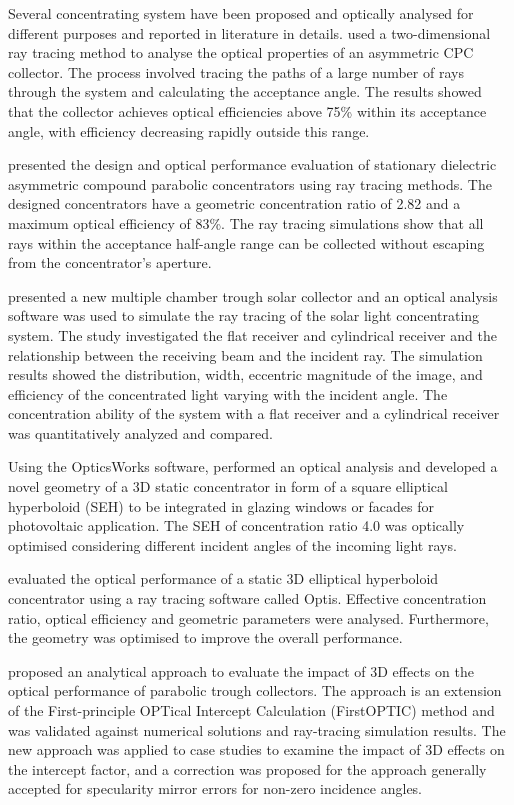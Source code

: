 Several concentrating system have been proposed and optically analysed for different purposes and reported in literature in details. \citet{Souliotis2011} used a two-dimensional ray tracing method to analyse the optical properties of an asymmetric CPC collector. The process involved tracing the paths of a large number of rays through the system and calculating the acceptance angle. The results showed that the collector achieves optical efficiencies above 75\% within its acceptance angle, with efficiency decreasing rapidly outside this range.

\citet{Sarmah2011} presented the design and optical performance evaluation of stationary dielectric asymmetric compound parabolic concentrators using ray tracing methods. The designed concentrators have a geometric concentration ratio of 2.82 and a maximum optical efficiency of 83\%. The ray tracing simulations show that all rays within the acceptance half-angle range can be collected without escaping from the concentrator's aperture.

\citet{Zheng2011} presented a new multiple chamber trough solar collector and an optical analysis software was used to simulate the ray tracing of the solar light concentrating system. The study investigated the flat receiver and cylindrical receiver and the relationship between the receiving beam and the incident ray. The simulation results showed the distribution, width, eccentric magnitude of the image, and efficiency of the concentrated light varying with the incident angle. The concentration ability of the system with a flat receiver and a cylindrical receiver was quantitatively analyzed and compared.

Using the OpticsWorks software, \citet{Sellami2012} performed an optical analysis and developed a novel geometry of a 3D static concentrator in form of a square elliptical hyperboloid (SEH) to be integrated in glazing windows or facades for photovoltaic application. The SEH of concentration ratio 4.0 was optically optimised considering different incident angles of the incoming light rays.

\citet{Ali2013} evaluated the optical performance of a static 3D elliptical hyperboloid concentrator using a ray tracing software called Optis. Effective concentration ratio, optical efficiency and geometric parameters were analysed. Furthermore, the geometry was optimised to improve the overall performance.

\citet{Binotti2013} proposed an analytical approach to evaluate the impact of 3D effects on the optical performance of parabolic trough collectors. The approach is an extension of the First-principle OPTical Intercept Calculation (FirstOPTIC) method and was validated against numerical solutions and ray-tracing simulation results. The new approach was applied to case studies to examine the impact of 3D effects on the intercept factor, and a correction was proposed for the approach generally accepted for specularity mirror errors for non-zero incidence angles.

